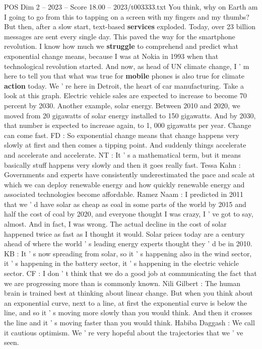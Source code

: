 \begin{textsample}{POS Dim 2 – 2023 – Score 18.00 – 2023/t003333.txt}
You think, why on Earth am I going to go from this to tapping on a screen with my fingers and my thumbs?
But then, after a slow start, text-based \textbf{services} exploded.
Today, over 23 billion messages are sent every single day.
This paved the way for the smartphone revolution.
I know how much we \textbf{struggle} to comprehend and predict what exponential change means, because I was at Nokia in 1993 when that technological revolution started.
And now, as head of UN climate change, I ' m here to tell you that what was true for \textbf{mobile} phones is also true for climate \textbf{action} today.
We ' re here in Detroit, the heart of car manufacturing.
Take a look at this graph.
Electric vehicle sales are expected to increase to become 70 percent by 2030.
Another example, solar energy.
Between 2010 and 2020, we moved from 20 gigawatts of solar energy installed to 150 gigawatts.
And by 2030, that number is expected to increase again, to 1, 000 gigawatts per year.
Change can come fast.
FD : So exponential change means that change happens very slowly at first and then comes a tipping point.
And suddenly things accelerate and accelerate and accelerate.
NT : It ' s a mathematical term, but it means basically stuff happens very slowly and then it goes really fast.
Tessa Kahn : Governments and experts have consistently underestimated the pace and scale at which we can deploy renewable energy and how quickly renewable energy and associated technologies become affordable.
Ramez Naam : I predicted in 2011 that we ' d have solar as cheap as coal in some parts of the world by 2015 and half the cost of coal by 2020, and everyone thought I was crazy, I ' ve got to say, almost.
And in fact, I was wrong.
The actual decline in the cost of solar happened twice as fast as I thought it would.
Solar prices today are a century ahead of where the world ' s leading energy experts thought they ' d be in 2010.
KB : It ' s now spreading from solar, so it ' s happening also in the wind sector, it ' s happening in the battery sector, it ' s happening in the electric vehicle sector.
CF : I don ' t think that we do a good job at communicating the fact that we are progressing more than is commonly known.
Nili Gilbert : The human brain is trained best at thinking about linear change.
But when you think about an exponential curve, next to a line, at first the exponential curve is below the line, and so it ' s moving more slowly than you would think.
And then it crosses the line and it ' s moving faster than you would think.
Habiba Daggash : We call it cautious optimism.
We ' re very hopeful about the trajectories that we ' ve seen.

\end{textsample}
